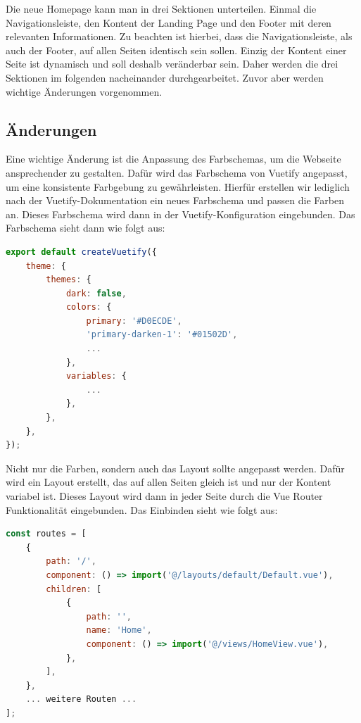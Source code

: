 Die neue Homepage kann man in drei Sektionen unterteilen. Einmal die Navigationsleiste, den Kontent der Landing Page und den Footer mit deren relevanten Informationen. Zu beachten ist hierbei, dass die Navigationsleiste, als auch der Footer, auf allen Seiten identisch sein sollen. Einzig der Kontent einer Seite ist dynamisch und soll deshalb veränderbar sein. Daher werden die drei Sektionen im folgenden nacheinander durchgearbeitet. Zuvor aber werden wichtige Änderungen vorgenommen.

\subsection{Änderungen}

Eine wichtige Änderung ist die Anpassung des Farbschemas, um die Webseite ansprechender zu gestalten. Dafür wird das Farbschema von Vuetify angepasst, um eine konsistente Farbgebung zu gewährleisten. Hierfür erstellen wir lediglich nach der Vuetify-Dokumentation ein neues Farbschema und passen die Farben an. Dieses Farbschema wird dann in der Vuetify-Konfiguration eingebunden. Das Farbschema sieht dann wie folgt aus: \cite{vuetiy-custom-color-theme}

\begin{lstlisting}[language={JavaScript}, caption={Vuetify Farbschema anpassung}]
export default createVuetify({
    theme: {
        themes: {
            dark: false,
            colors: {
                primary: '#D0ECDE',
                'primary-darken-1': '#01502D',
                ...
            },
            variables: {
                ...
            },
        },
    },
});
\end{lstlisting}

Nicht nur die Farben, sondern auch das Layout sollte angepasst werden. Dafür wird ein Layout erstellt, das auf allen Seiten gleich ist und nur der Kontent variabel ist. Dieses Layout wird dann in jeder Seite durch die Vue Router Funktionalität eingebunden. Das Einbinden sieht wie folgt aus:

\begin{lstlisting}[language={JavaScript}, caption={Einbindung des Layouts in der Vue Router Konfiguration}]
const routes = [
    {
        path: '/',
        component: () => import('@/layouts/default/Default.vue'),
        children: [
            {
                path: '',
                name: 'Home',
                component: () => import('@/views/HomeView.vue'),
            },
        ],
    },
    ... weitere Routen ...
];
\end{lstlisting}


